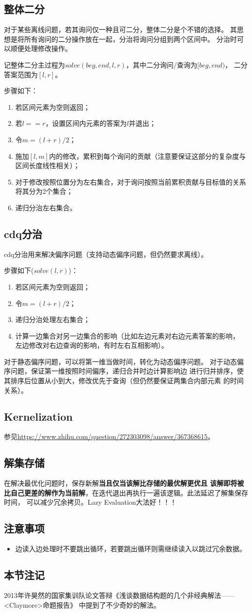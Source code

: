 \subsection{整体二分}
对于某些离线问题，若其询问仅一种且可二分，整体二分是个不错的选择。
其思想是将所有询问的二分操作放在一起，分治将询问分组到两个区间中。
分治时可以顺便处理修改操作。

记整体二分主过程为$solve(beg,end,l,r)$，其中二分询问/查询为$[beg,end)$，
二分答案范围为$[l,r]$。

步骤如下：
\begin{enumerate}
	\item 若区间元素为空则返回；
	\item 若$l==r$，设置区间内元素的答案为$l$并退出；
	\item 令$m=(l+r)/2$；
	\item 施加$[l,m]$内的修改，累积到每个询问的贡献（注意要保证这部分的复杂度与
	区间长度线性相关）；
	\item 对于修改按照位置分为左右集合，对于询问按照当前累积贡献与目标值的关系
	将其分为2个集合；
	\item 递归分治左右集合。
\end{enumerate}
\subsection{cdq分治}
cdq分治用来解决偏序问题（支持动态偏序问题，但仍然要求离线）。

步骤如下($solve(l,r)$)：
\begin{enumerate}
	\item 若区间元素为空则返回；
	\item 令$m=(l+r)/2$；
	\item 递归分治处理左右集合；
	\item 计算一边集合对另一边集合的影响（比如左边元素对右边元素答案的影响，
	左边修改对右边查询的影响，有时左右互相影响）。
\end{enumerate}

对于静态偏序问题，可以将第一维当做时间，转化为动态偏序问题。
对于动态偏序问题，保证第一维按照时间偏序，递归合并时边计算影响边
进行归并排序，使其排序后位置从小到大，修改优先于查询（但仍然要保证两集合内部元素
的时间关系）。
\subsection{Kernelization}
参见\url{https://www.zhihu.com/question/272303098/answer/367368615}。
\subsection{解集存储}
在解决最优化问题时，保存新解{\bfseries 当且仅当该解比存储的最优解更优且
该解即将被比自己更差的解作为当前解}，在迭代退出再执行一遍该逻辑。此法延迟了解集保存时间，
可以减少冗余拷贝。Lazy Evaluation大法好！！！
\subsection{注意事项}
\begin{itemize}
	\item 边读入边处理时不要跳出循环，若要跳出循环则需继续读入以跳过冗余数据。
\end{itemize}
\subsection{本节注记}
2013年许昊然的国家集训队论文答辩《浅谈数据结构题的几个非经典解法——<Claymore>命题报告》
中提到了不少奇妙的解法。
